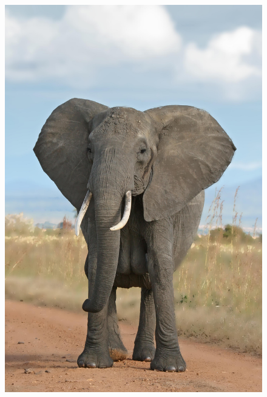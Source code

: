 \documentclass[12pt]{article}
\begin{document}
\begin{figure}[!htb]
    \includegraphics[width=0.9\linewidth]{large_elephant_portrait.jpg}
\end{figure}
\end{document}
